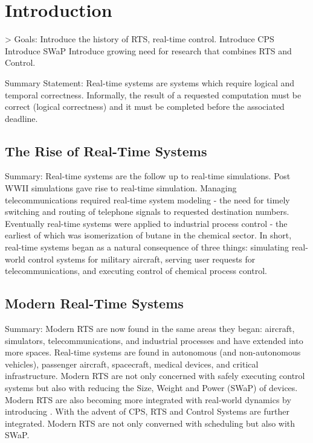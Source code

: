 \section{Introduction}   \label{chap:introduction}

> Goals:
Introduce the history of RTS, real-time control.
Introduce CPS
Introduce SWaP
Introduce growing need for research that combines RTS and Control.

Summary Statement: Real-time systems are systems which require logical and temporal correctness. Informally, the result of a requested computation must be correct (logical correctness) and it must be completed before the associated deadline.

\subsection{The Rise of Real-Time Systems}

Summary: Real-time systems are the follow up to real-time simulations. Post WWII simulations gave rise to real-time simulation. Managing telecommunications required real-time system modeling - the need for timely switching and routing of telephone signals to requested destination numbers. Eventually real-time systems were applied to industrial process control - the earliest of which was isomerization of butane in the chemical sector. In short, real-time systems began as a natural consequence of three things: simulating real-world control systems for military aircraft, serving user requests for telecommunications, and executing control of chemical process control.

\subsection{Modern Real-Time Systems}

Summary: Modern RTS are now found in the same areas they began: aircraft, simulators, telecommunications, and industrial processes and have extended into more spaces.
Real-time systems are found in autonomous (and non-autonomous vehicles), passenger aircraft, spacecraft, medical devices, and critical infrastructure.
Modern RTS are not only concerned with safely executing control systems but also with reducing the Size, Weight and Power (SWaP) of devices.
Modern RTS are also becoming more integrated with real-world dynamics by introducing .
With the advent of CPS, RTS and Control Systems are further integrated.
Modern RTS are not only converned with scheduling but also with SWaP.

